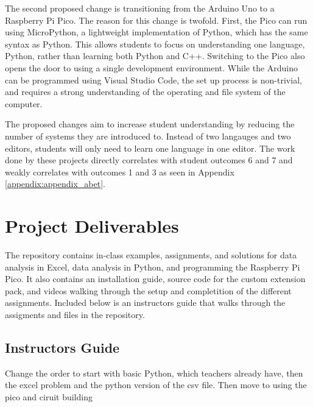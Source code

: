 The second proposed change is transitioning from the Arduino Uno
to a Raspberry Pi Pico. The reason for this change is twofold. First,
the Pico can run using MicroPython, a lightweight implementation of
Python, which has the same syntax as Python. This allows students
to focus on understanding one language, Python, rather than learning
both Python and C++. Switching to the Pico also opens the door to
using a single development environment. While the Arduino can
be programmed using Visual Studio Code, the set up process
is non-trivial, and requires a strong understanding of the
operating and file system of the computer. 

The proposed changes aim to increase student understanding
by reducing the number of systems they are introduced to. Instead
of two langauges and two editors, students will only need to
learn one language in one editor. The work done by these projects
directly correlates with student outcomes 6 and 7 and weakly
correlates with outcomes 1 and 3 as seen in Appendix 
\ref{appendix:appendix_abet}.

\section{Project Deliverables}
The repository contains in-class examples, assignments, and 
solutions for data analysis in Excel, data analysis in Python, 
and programming the Raspberry Pi Pico. It also contains an 
installation guide, source code for the custom extension pack, 
and videos walking through the setup and completition of the 
different assignments. Included below is an instructors guide
that walks through the assigments and files in the repository.

\subsection{Instructors Guide}
Change the order to start with basic Python, which teachers
already have, then the excel problem and the python version of
the csv file. Then move to using the pico and ciruit building

